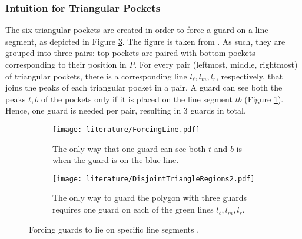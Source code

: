 \newpage
\subsubsection{Intuition for Triangular Pockets}
The six triangular pockets are created in order to force a guard on a line segment, as depicted in Figure \ref{fig:tb}. The figure is taken from \cite{abrahamsen2021art}. As such, they are grouped into three pairs: top pockets are paired with bottom pockets corresponding to their position in $P$. For every pair (leftmost, middle, rightmost) of triangular pockets, there is a corresponding line $l_\ell, l_m, l_r$, respectively, that joins the peaks of each triangular pocket in a pair. A guard can see both the peaks $t, b$ of the pockets only if it is placed on the line segment $\overline{tb}$ (Figure \ref{fig:forcing_line}). Hence, one guard is needed per pair, resulting in 3 guards in total.

\begin{figure}[h!]
    \centering
    \begin{subfigure}{0.3\textwidth}
        \centering
        \texttt{[image: literature/ForcingLine.pdf]}
        \caption{The only way that one guard can see both $t$ and $b$ is when the guard is on the blue line.}
        \label{fig:forcing_line}
    \end{subfigure}
    \hfill
    \begin{subfigure}{0.65\textwidth}
        \centering
        \texttt{[image: literature/DisjointTriangleRegions2.pdf]}
        \caption{The only way to guard the polygon with three guards requires one guard on each of the green lines $l_\ell, l_m, l_r$.}
        \label{fig:disjoint_triangle}
    \end{subfigure}
    \caption{Forcing guards to lie on specific line segments \cite{1057165}.}
    \label{fig:tb}
\end{figure}

\newpage
